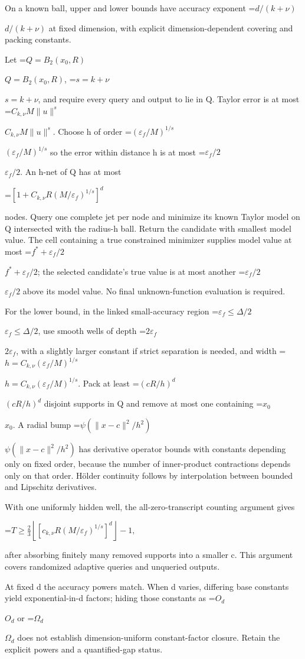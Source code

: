 \documentclass[10pt,a4paper]{article}
\newcommand{\AtlasMath}[1]{\par\begingroup\centering\setbox0=\hbox{$\displaystyle #1$}\ifdim\wd0>1.4\linewidth\typeout{ATLAS WIDE FORMULA: \the\wd0}\fi\ifdim\wd0>\linewidth\resizebox{\linewidth}{!}{\box0}\else\box0\fi\par\endgroup}
\newcommand{\AtlasInlineMath}[1]{\begingroup\setbox0=\hbox{$#1$}\ifdim\wd0>.4\linewidth\endgroup\AtlasMath{#1}\else\endgroup$#1$\fi}
\begin{document}
On a known ball, upper and lower bounds have accuracy exponent \AtlasInlineMath{d/(k+\nu)} at fixed dimension, with explicit dimension-dependent covering and packing constants.

Let \AtlasInlineMath{Q=B_2(x_0,R)}, \AtlasInlineMath{s=k+\nu}, and require every query and output to lie in Q. Taylor error is at most \AtlasInlineMath{C_{k,\nu}M\|u\|^s}. Choose h of order \AtlasInlineMath{(\varepsilon_f/M)^{1/s}} so the error within distance h is at most \AtlasInlineMath{\varepsilon_f/2}. An h-net of Q has at most

\AtlasMath{[1+C_{k,\nu}R(M/\varepsilon_f)^{1/s}]^d}

nodes. Query one complete jet per node and minimize its known Taylor model on Q intersected with the radius-h ball. Return the candidate with smallest model value. The cell containing a true constrained minimizer supplies model value at most \AtlasInlineMath{f^*+\varepsilon_f/2}; the selected candidate's true value is at most another \AtlasInlineMath{\varepsilon_f/2} above its model value. No final unknown-function evaluation is required.

For the lower bound, in the linked small-accuracy region \AtlasInlineMath{\varepsilon_f\le\Delta/2}, use smooth wells of depth \AtlasInlineMath{2\varepsilon_f}, with a slightly larger constant if strict separation is needed, and width \AtlasInlineMath{h=C_{k,\nu}(\varepsilon_f/M)^{1/s}}. Pack at least \AtlasInlineMath{(cR/h)^d} disjoint supports in Q and remove at most one containing \AtlasInlineMath{x_0}. A radial bump \AtlasInlineMath{\psi(\|x-c\|^2/h^2)} has derivative operator bounds with constants depending only on fixed order, because the number of inner-product contractions depends only on that order. Hölder continuity follows by interpolation between bounded and Lipschitz derivatives.

With one uniformly hidden well, the all-zero-transcript counting argument gives

\AtlasMath{T\ge\frac23\left\lfloor[c_{k,\nu}R(M/\varepsilon_f)^{1/s}]^d\right\rfloor-1,}

after absorbing finitely many removed supports into a smaller c. This argument covers randomized adaptive queries and unqueried outputs.

At fixed d the accuracy powers match. When d varies, differing base constants yield exponential-in-d factors; hiding those constants as \AtlasInlineMath{O_d} or \AtlasInlineMath{\Omega_d} does not establish dimension-uniform constant-factor closure. Retain the explicit powers and a quantified-gap status.
\end{document}
